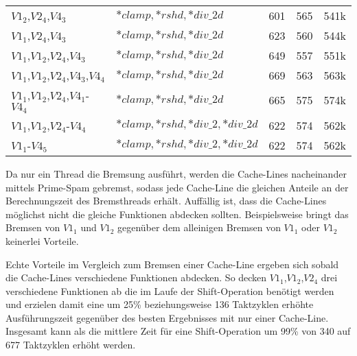 \begin{table}[h]
\begin{tabular}{llccc}
$V1_2$,$V2_4$,$V4_3$        & $*clamp,*rshd,*div\_2d$                             & 601   & 565 & 541k    \\
$V1_1$,$V2_4$,$V4_3$        & $*clamp,*rshd,*div\_2d$                             & 623   & 560 & 544k    \\
$V1_1$,$V1_2$,$V2_4$,$V4_3$     & $*clamp,*rshd,*div\_2d$                             & 649   & 557 & 551k    \\
$V1_1$,$V1_2$,$V2_4$,$V4_3$,$V4_4$ & $*clamp,*rshd,*div\_2d$                             & 669   & 563 & 563k    \\
$V1_1$,$V1_2$,$V2_4$,$V4_1$-$V4_4$  & $*clamp,*rshd,*div\_2d$                             & 665   & 575 & 574k    \\
$V1_1$,$V1_2$,$V2_4$-$V4_4$     & $*clamp,*rshd,*div\_2,*div\_2d$               & 622   & 574 & 562k    \\
$V1_1$-$V4_5$           & $*clamp,*rshd,*div\_2,*div\_2d$               & 622   & 574 & 562k \\
\bottomrule
\end{tabular}
\end{table}

Da nur ein Thread die Bremsung ausführt, werden die Cache-Lines nacheinander mittels Prime-Spam gebremst, sodass jede Cache-Line die gleichen Anteile an der Berechnungszeit des Bremsthreads erhält.
Auffällig ist, dass die Cache-Lines möglichst nicht die gleiche Funktionen abdecken sollten.
Beispielsweise bringt das Bremsen von $V1_1$ und $V1_2$ gegenüber dem alleinigen Bremsen von $V1_1$ oder $V1_2$ keinerlei Vorteile.

Echte Vorteile im Vergleich zum Bremsen einer Cache-Line ergeben sich sobald die Cache-Lines verschiedene Funktionen abdecken.
So decken $V1_1$,$V1_2$,$V2_4$ drei verschiedene Funktionen ab die im Laufe der Shift-Operation benötigt werden und erzielen damit eine um 25\% beziehungsweise 136 Taktzyklen erhöhte Ausführungszeit gegenüber des besten Ergebnisses mit nur einer Cache-Line.
Insgesamt kann als die mittlere Zeit für eine Shift-Operation um 99\% von 340 auf 677 Taktzyklen erhöht werden.

